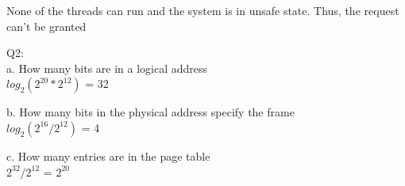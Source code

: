 \documentclass[a4paper]{article}
\begin{document}
None of the threads can run and the system is in unsafe state.
Thus, the request can’t be granted

Q2:\\
a. How many bits are in a logical address\\
$log_2(2^{20} * 2^{12})$ = 32

b. How many bits in the physical address specify the frame\\
$log_2(2^{16} / 2^{12})$ = 4

c. How many entries are in the page table\\
$2^{32} / 2^{12}$ = $2^{20}$
\end{document}

